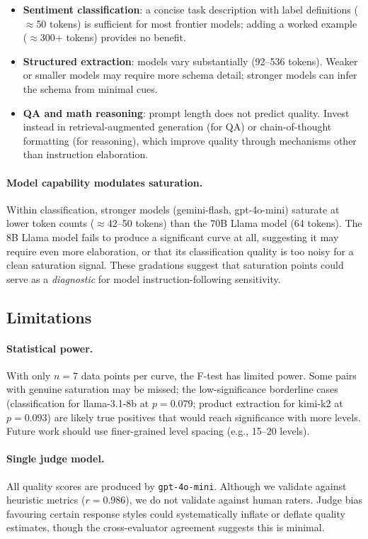 \begin{itemize}
  \item \textbf{Sentiment classification}: a concise task description with
    label definitions ($\approx$50 tokens) is sufficient for most frontier
    models; adding a worked example ($\approx$300+ tokens) provides no benefit.
  \item \textbf{Structured extraction}: models vary substantially (92--536
    tokens). Weaker or smaller models may require more schema detail;
    stronger models can infer the schema from minimal cues.
  \item \textbf{QA and math reasoning}: prompt length does not predict
    quality. Invest instead in retrieval-augmented generation (for QA) or
    chain-of-thought formatting (for reasoning), which improve quality through
    mechanisms other than instruction elaboration.
\end{itemize}

\paragraph{Model capability modulates saturation.}
Within classification, stronger models (gemini-flash, gpt-4o-mini) saturate
at lower token counts ($\approx$42--50 tokens) than the 70B Llama model (64
tokens).
The 8B Llama model fails to produce a significant curve at all, suggesting it
may require even more elaboration, or that its classification quality is too
noisy for a clean saturation signal.
These gradations suggest that saturation points could serve as a
\emph{diagnostic} for model instruction-following sensitivity.

\subsection{Limitations}
\label{sec:limitations}

\paragraph{Statistical power.}
With only $n = 7$ data points per curve, the F-test has limited power.
Some pairs with genuine saturation may be missed; the low-significance
borderline cases (classification for llama-3.1-8b at $p = 0.079$;
product extraction for kimi-k2 at $p = 0.093$) are likely true positives
that would reach significance with more levels.
Future work should use finer-grained level spacing (e.g., 15--20 levels).

\paragraph{Single judge model.}
All quality scores are produced by \texttt{gpt-4o-mini}.
Although we validate against heuristic metrics ($r = 0.986$), we do not
validate against human raters.
Judge bias favouring certain response styles could systematically inflate or
deflate quality estimates, though the cross-evaluator agreement suggests this
is minimal.

